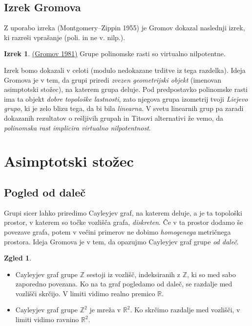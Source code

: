 \documentclass[11pt]{book}
\def\ZZ{\mathbb{Z}}
\def\RR{\mathbb{R}}
\def\vprasanje{\color{oranzna}}
\def\literatura{\color{modra}}
\theoremstyle{definition}
\theoremstyle{zgled}
\newtheorem*{zgled}{Zgled}
\theoremstyle{odprtproblem}
\theoremstyle{domacanaloga}
\theoremstyle{izrek}
\newtheorem*{izrek}{Izrek}
\begin{document}
\subsection{Izrek Gromova}

Z uporabo izreka {\literatura (Montgomery--Zippin 1955)} je Gromov dokazal naslednji izrek, ki razreši vprašanje {\vprasanje \sc (poli. in ne v. nilp.)}.

\begin{izrek}\href{http://www.numdam.org/article/PMIHES_1981__53__53_0.pdf}{(Gromov 1981)}
Grupe polinomske rasti so virtualno nilpotentne.
\end{izrek}

Izrek bomo dokazali v celoti (modulo nedokazane trditve iz tega razdelka). Ideja Gromova je v tem, da grupi priredi {\em zvezen geometrijski objekt} (imenovan asimptotski stožec),  na katerem grupa deluje. Pod predpostavko polinomske rasti ima ta objekt {\em dobre topološke lastnosti}, zato njegova grupa izometrij tvoji {\em Liejevo grupo}, ki je zelo blizu tega, da bi bila {\em linearna}. V svetu linearnih grup pa zaradi dokazanih rezultatov o rešljivih grupah in Titsovi alternativi že vemo, da {\em polinomska rast implicira virtualno nilpotentnost}.

\section{Asimptotski stožec}

\subsection{Pogled od daleč}

Grupi sicer lahko priredimo Cayleyjev graf, na katerem deluje, a je ta topološki prostor, v katerem so točke vozlišča grafa, {\em diskreten}. Če v ta prostor dodamo še povezave grafa, potem v večini primerov ne dobimo {\em homogenega} metričnega prostora. Ideja Gromova je v tem, da opazujmo Cayleyjev graf grupe {\em od daleč}.

\begin{zgled}
\begin{itemize}
    \item Cayleyjev graf grupe $\ZZ$ sestoji iz vozlišč, indeksiranih z $\ZZ$, ki so med sabo zaporedno povezana. Ko na ta graf pogledamo od daleč, se razdalje med vozlišči skrčijo. V limiti vidimo realno premico $\RR$.

    \item Cayleyjev graf grupe $\ZZ^2$ je mreža v $\RR^2$. Ko skrčimo razdalje med vozlišči, v limiti vidimo ravnino $\RR^2$.
\end{itemize}
\end{zgled}
\end{document}
